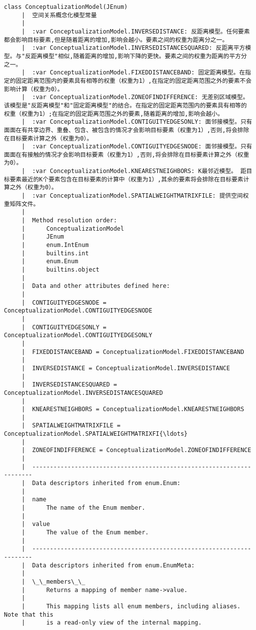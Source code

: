 \documentclass[11pt]{article}
\begin{document}
\begin{Verbatim}[commandchars=\\\{\}]
    class ConceptualizationModel(JEnum)
     |  空间关系概念化模型常量
     |  
     |  :var ConceptualizationModel.INVERSEDISTANCE: 反距离模型。任何要素都会影响目标要素,但是随着距离的增加,影响会越小。要素之间的权重为距离分之一。
     |  :var ConceptualizationModel.INVERSEDISTANCESQUARED: 反距离平方模型。与"反距离模型"相似,随着距离的增加,影响下降的更快。要素之间的权重为距离的平方分之一。
     |  :var ConceptualizationModel.FIXEDDISTANCEBAND: 固定距离模型。在指定的固定距离范围内的要素具有相等的权重（权重为1）,在指定的固定距离范围之外的要素不会影响计算（权重为0）。
     |  :var ConceptualizationModel.ZONEOFINDIFFERENCE: 无差别区域模型。 该模型是"反距离模型"和"固定距离模型"的结合。在指定的固定距离范围内的要素具有相等的权重（权重为1）;在指定的固定距离范围之外的要素,随着距离的增加,影响会越小。
     |  :var ConceptualizationModel.CONTIGUITYEDGESONLY: 面邻接模型。只有面面在有共享边界、重叠、包含、被包含的情况才会影响目标要素（权重为1）,否则,将会排除在目标要素计算之外（权重为0）。
     |  :var ConceptualizationModel.CONTIGUITYEDGESNODE: 面邻接模型。只有面面在有接触的情况才会影响目标要素（权重为1）,否则,将会排除在目标要素计算之外（权重为0）。
     |  :var ConceptualizationModel.KNEARESTNEIGHBORS: K最邻近模型。 距目标要素最近的K个要素包含在目标要素的计算中（权重为1）,其余的要素将会排除在目标要素计算之外（权重为0）。
     |  :var ConceptualizationModel.SPATIALWEIGHTMATRIXFILE: 提供空间权重矩阵文件。
     |  
     |  Method resolution order:
     |      ConceptualizationModel
     |      JEnum
     |      enum.IntEnum
     |      builtins.int
     |      enum.Enum
     |      builtins.object
     |  
     |  Data and other attributes defined here:
     |  
     |  CONTIGUITYEDGESNODE = ConceptualizationModel.CONTIGUITYEDGESNODE
     |  
     |  CONTIGUITYEDGESONLY = ConceptualizationModel.CONTIGUITYEDGESONLY
     |  
     |  FIXEDDISTANCEBAND = ConceptualizationModel.FIXEDDISTANCEBAND
     |  
     |  INVERSEDISTANCE = ConceptualizationModel.INVERSEDISTANCE
     |  
     |  INVERSEDISTANCESQUARED = ConceptualizationModel.INVERSEDISTANCESQUARED
     |  
     |  KNEARESTNEIGHBORS = ConceptualizationModel.KNEARESTNEIGHBORS
     |  
     |  SPATIALWEIGHTMATRIXFILE = ConceptualizationModel.SPATIALWEIGHTMATRIXFI{\ldots}
     |  
     |  ZONEOFINDIFFERENCE = ConceptualizationModel.ZONEOFINDIFFERENCE
     |  
     |  ----------------------------------------------------------------------
     |  Data descriptors inherited from enum.Enum:
     |  
     |  name
     |      The name of the Enum member.
     |  
     |  value
     |      The value of the Enum member.
     |  
     |  ----------------------------------------------------------------------
     |  Data descriptors inherited from enum.EnumMeta:
     |  
     |  \_\_members\_\_
     |      Returns a mapping of member name->value.
     |      
     |      This mapping lists all enum members, including aliases. Note that this
     |      is a read-only view of the internal mapping.
    

\end{Verbatim}
\end{document}
